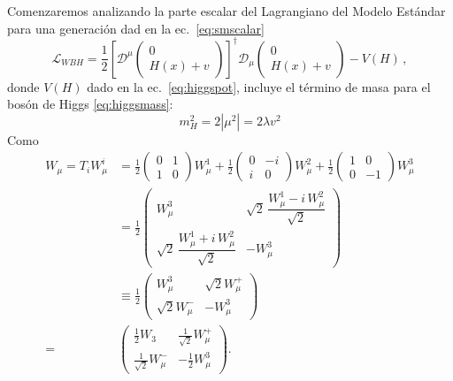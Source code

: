 \begin{frame}
Comenzaremos analizando la parte escalar del Lagrangiano del Modelo Estándar para una generación dad en la ec.~\eqref{eq:smscalar}
\begin{equation}
  \mathcal{L}_{WBH}=\frac{1}{2}\left[\mathcal{D}^\mu \begin{pmatrix}
    0\\
    H(x)+v
  \end{pmatrix}\right]^\dagger\mathcal{D}_\mu\begin{pmatrix}
    0\\
    H(x)+v
  \end{pmatrix}-V(H)\,,
\end{equation}
donde $V(H)$ dado en la ec.~\eqref{eq:higgspot}, incluye el término de masa para el bosón de Higgs \eqref{eq:higgsmass}:
\begin{equation}
  m_H^2=2\left|\mu^2\right|=2\lambda v^2
\end{equation}
Como
\begin{align}
      W_\mu=T_i W^{i}_\mu&=
  \frac{1}{2}\begin{pmatrix}
    0&1\\
    1&0
  \end{pmatrix}W^1_\mu+
  \frac{1}{2}\begin{pmatrix}
    0&-i\\
    i&0
  \end{pmatrix}W^2_\mu+
  \frac{1}{2}\begin{pmatrix}
    1&0\\
    0&-1
  \end{pmatrix}W^3_\mu\nonumber\\
  &=
  \frac{1}{2}\begin{pmatrix}
    W^3_\mu                                  &\sqrt{2}\,\dfrac{W^1_\mu-i\,W^2_\mu}{\sqrt{2}}\\
    \sqrt{2}\,\dfrac{W^1_\mu+i\,W^2_\mu}{\sqrt{2}} &-W^3_\mu
  \end{pmatrix}\nonumber\\
  &\equiv
  \frac{1}{2}\begin{pmatrix}
    W^3_\mu&\sqrt{2}W^+_\mu\\
    \sqrt{2}W^-_\mu&-W^3_\mu
  \end{pmatrix}\nonumber\\
=&\begin{pmatrix}
    \frac{1}{2}W_3&\frac{1}{\sqrt{2}}W^+_\mu\\
    \frac{1}{\sqrt{2}}W^-_\mu&-\frac{1}{2}W^3_\mu
  \end{pmatrix}.
\end{align}

\end{frame}

